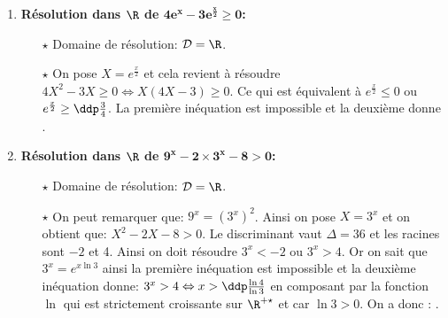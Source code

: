 \begin{correction}
\begin{enumerate}
\begin{itemize}
\end{itemize} 
\item \textbf{R\'esolution dans $\mathbf{\R}$ de $\mathbf{4e^x-3e^{\frac{x}{2}}\geq 0}$:}\\
\noindent \begin{itemize}
\item[$\star$] Domaine de r\'esolution: $\mathcal{D}=\R$.
\item[$\star$] On pose $X=e^{\frac{x}{2}}$ et cela revient \`{a} r\'esoudre $4X^2-3X\geq 0\Leftrightarrow X(4X-3)\geq 0$. Ce qui est \'equivalent \`{a} $e^{\frac{x}{2}} \leq 0$ ou $e^{\frac{x}{2}}\geq \ddp\frac{3}{4}$. La premi\`{e}re in\'equation est impossible et la deuxi\`{e}me donne .
\end{itemize} 
\item \textbf{R\'esolution dans $\mathbf{\R}$ de $\mathbf{9^x-2\times 3^x-8>0}$:}\\
\noindent 
\begin{itemize}
\item[$\star$] Domaine de r\'esolution: $\mathcal{D}=\R$.
\item[$\star$] On peut remarquer que: $9^x=(3^x)^2$. Ainsi on pose $X=3^x$ et on obtient que: $X^2-2X-8>0$. Le discriminant vaut $\Delta=36$ et les racines sont $-2$ et 4. Ainsi on doit r\'esoudre $3^x<-2$ ou $3^x>4$. Or on sait que $3^x=e^{x\ln{3}}$ ainsi la premi\`{e}re in\'equation est impossible et la deuxi\`{e}me in\'equation donne: 
$3^x>4 \Leftrightarrow x>\ddp\frac{\ln{4}}{\ln{3}}$ en composant par la fonction $\ln{}$ qui est strictement croissante sur $\R^{+\star}$ et car $\ln{3}>0$.  On a donc : .
\end{itemize} 

\end{enumerate}
\end{correction}
